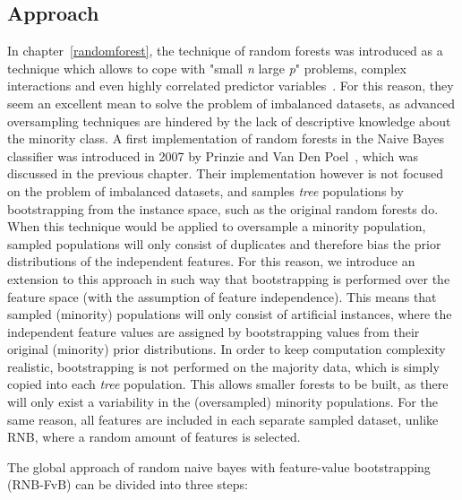 \subsection{Approach}
In chapter~\ref{randomforest}, the technique of random forests was introduced as a technique which allows to cope with "small \textit{n} large \textit{p}" problems, complex interactions and even highly correlated predictor variables~\cite{strobl08why}. For this reason, they seem an excellent mean to solve the problem of imbalanced datasets, as advanced oversampling techniques are hindered by the lack of descriptive knowledge about the minority class. A first implementation of random forests in the  Naive Bayes classifier was introduced in 2007 by Prinzie and Van Den Poel~\cite{rmc07}, which was discussed in the previous chapter. Their implementation however is not focused on the problem of imbalanced datasets, and samples \textit{tree} populations by bootstrapping from the instance space, such as the original random forests do. When this technique would be applied to oversample a minority population,  sampled populations will only consist of duplicates and therefore bias the prior distributions of the independent features. For this reason, we introduce an extension to this approach in such way that bootstrapping is performed over the feature space (with the assumption of feature independence). This means that sampled (minority) populations will only consist of artificial instances, where the independent feature values are assigned by bootstrapping values from their original (minority) prior distributions. In order to keep computation complexity realistic, bootstrapping is not performed on the majority data, which is simply copied into each \textit{tree} population. This allows smaller forests to be built, as there will only exist a variability in the (oversampled) minority populations. For the same reason, all features are included in each separate sampled dataset, unlike RNB, where a random amount of features is selected.  

\newpage
The global approach of random naive bayes with feature-value bootstrapping (RNB-FvB) can be divided into three steps:

